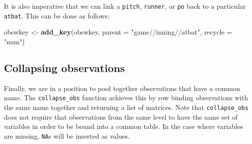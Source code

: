 \documentclass[12pt,]{isuthesis}
\newenvironment{Shaded}{\begin{snugshade}}{\end{snugshade}}
\newcommand{\KeywordTok}[1]{\textcolor[rgb]{0.13,0.29,0.53}{\textbf{{#1}}}}
\newcommand{\DataTypeTok}[1]{\textcolor[rgb]{0.13,0.29,0.53}{{#1}}}
\newcommand{\StringTok}[1]{\textcolor[rgb]{0.31,0.60,0.02}{{#1}}}
\newcommand{\NormalTok}[1]{{#1}}
\begin{document}
It is also imperative that we can link a \texttt{pitch},
\texttt{runner}, or \texttt{po} back to a particular \texttt{atbat}.
This can be done as follows:

\begin{Shaded}
\begin{Highlighting}[]
\NormalTok{obswkey <-}\StringTok{ }\KeywordTok{add_key}\NormalTok{(obswkey, }\DataTypeTok{parent =} \StringTok{"game//inning//atbat"}\NormalTok{, }\DataTypeTok{recycle =} \StringTok{"num"}\NormalTok{)}
\end{Highlighting}
\end{Shaded}

\subsection{Collapsing observations}\label{collapsing-observations}

Finally, we are in a position to pool together observations that have a
common name. The \texttt{collapse\_obs} function achieves this by row
binding observations with the same name together and returning a list of
matrices. Note that \texttt{collapse\_obs} does not require that
observations from the same level to have the same set of variables in
order to be bound into a common table. In the case where variables are
missing, \texttt{NA}s will be inserted as values.
\end{document}
